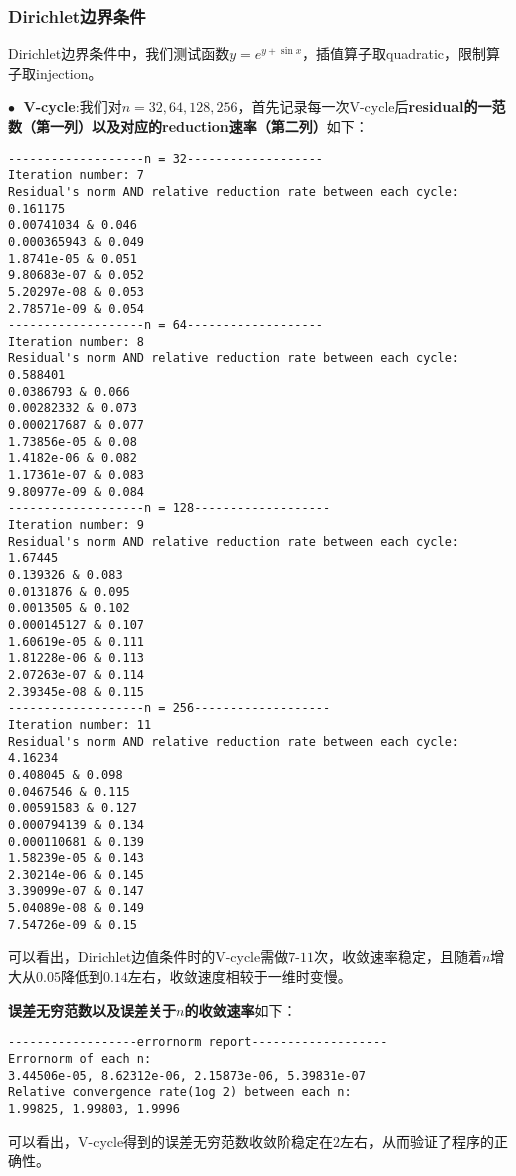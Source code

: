 \documentclass{ctexart}
\begin{document}
\begin{sloppypar}
\subsubsection{Dirichlet边界条件}
Dirichlet边界条件中，我们测试函数$y=e^{y+\sin x}$，插值算子取quadratic，限制算子取injection。

$\bullet \;$ \textbf{V-cycle}:我们对$n=32,64,128,256$，首先记录每一次V-cycle后\textbf{residual的一范数（第一列）以及对应的reduction速率（第二列）}如下：
\begin{shaded}
\begin{verbatim}
-------------------n = 32-------------------
Iteration number: 7
Residual's norm AND relative reduction rate between each cycle: 
0.161175
0.00741034 & 0.046
0.000365943 & 0.049
1.8741e-05 & 0.051
9.80683e-07 & 0.052
5.20297e-08 & 0.053
2.78571e-09 & 0.054
-------------------n = 64-------------------
Iteration number: 8
Residual's norm AND relative reduction rate between each cycle: 
0.588401
0.0386793 & 0.066
0.00282332 & 0.073
0.000217687 & 0.077
1.73856e-05 & 0.08
1.4182e-06 & 0.082
1.17361e-07 & 0.083
9.80977e-09 & 0.084
-------------------n = 128-------------------
Iteration number: 9
Residual's norm AND relative reduction rate between each cycle: 
1.67445
0.139326 & 0.083
0.0131876 & 0.095
0.0013505 & 0.102
0.000145127 & 0.107
1.60619e-05 & 0.111
1.81228e-06 & 0.113
2.07263e-07 & 0.114
2.39345e-08 & 0.115
-------------------n = 256-------------------
Iteration number: 11
Residual's norm AND relative reduction rate between each cycle: 
4.16234
0.408045 & 0.098
0.0467546 & 0.115
0.00591583 & 0.127
0.000794139 & 0.134
0.000110681 & 0.139
1.58239e-05 & 0.143
2.30214e-06 & 0.145
3.39099e-07 & 0.147
5.04089e-08 & 0.149
7.54726e-09 & 0.15
\end{verbatim}
\end{shaded}
可以看出，Dirichlet边值条件时的V-cycle需做$7$-$11$次，收敛速率稳定，且随着$n$增大从$0.05$降低到$0.14$左右，收敛速度相较于一维时变慢。

\textbf{误差无穷范数以及误差关于$n$的收敛速率}如下：
\begin{shaded}
\begin{verbatim}
------------------errornorm report-------------------
Errornorm of each n: 
3.44506e-05, 8.62312e-06, 2.15873e-06, 5.39831e-07 
Relative convergence rate(1og 2) between each n: 
1.99825, 1.99803, 1.9996
\end{verbatim} 
\end{shaded}
可以看出，V-cycle得到的误差无穷范数收敛阶稳定在$2$左右，从而验证了程序的正确性。


\end{sloppypar}
\end{document}
